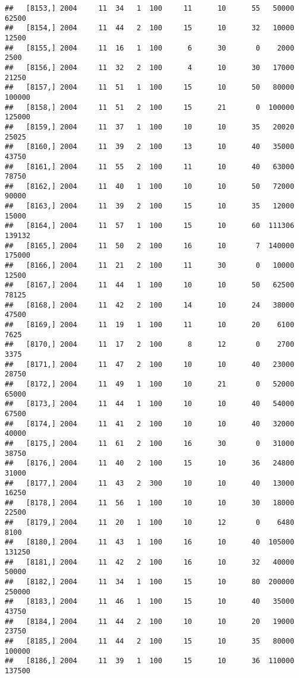 \documentclass{article}\usepackage[]{graphicx}\usepackage[]{color}
\makeatletter
\newenvironment{kframe}{%
 \def\at@end@of@kframe{}%
 \ifinner\ifhmode%
  \def\at@end@of@kframe{\end{minipage}}%
  \begin{minipage}{\columnwidth}%
 \fi\fi%
 \def\FrameCommand##1{\hskip\@totalleftmargin \hskip-\fboxsep
 \colorbox{shadecolor}{##1}\hskip-\fboxsep
     \hskip-\linewidth \hskip-\@totalleftmargin \hskip\columnwidth}%
 \MakeFramed {\advance\hsize-\width
   \@totalleftmargin\z@ \linewidth\hsize
   \@setminipage}}%
 {\par\unskip\endMakeFramed%
 \at@end@of@kframe}
\newenvironment{knitrout}{}{} %
\makeatother
\begin{document}
\begin{knitrout}
\begin{kframe}
\begin{verbatim}
##   [8153,] 2004     11  34   1  100     11      10      55   50000   62500
##   [8154,] 2004     11  44   2  100     15      10      32   10000   12500
##   [8155,] 2004     11  16   1  100      6      30       0    2000    2500
##   [8156,] 2004     11  32   2  100      4      10      30   17000   21250
##   [8157,] 2004     11  51   1  100     15      10      50   80000  100000
##   [8158,] 2004     11  51   2  100     15      21       0  100000  125000
##   [8159,] 2004     11  37   1  100     10      10      35   20020   25025
##   [8160,] 2004     11  39   2  100     13      10      40   35000   43750
##   [8161,] 2004     11  55   2  100     11      10      40   63000   78750
##   [8162,] 2004     11  40   1  100     10      10      50   72000   90000
##   [8163,] 2004     11  39   2  100     15      10      35   12000   15000
##   [8164,] 2004     11  57   1  100     15      10      60  111306  139132
##   [8165,] 2004     11  50   2  100     16      10       7  140000  175000
##   [8166,] 2004     11  21   2  100     11      30       0   10000   12500
##   [8167,] 2004     11  44   1  100     10      10      50   62500   78125
##   [8168,] 2004     11  42   2  100     14      10      24   38000   47500
##   [8169,] 2004     11  19   1  100     11      10      20    6100    7625
##   [8170,] 2004     11  17   2  100      8      12       0    2700    3375
##   [8171,] 2004     11  47   2  100     10      10      40   23000   28750
##   [8172,] 2004     11  49   1  100     10      21       0   52000   65000
##   [8173,] 2004     11  44   1  100     10      10      40   54000   67500
##   [8174,] 2004     11  41   2  100     10      10      40   32000   40000
##   [8175,] 2004     11  61   2  100     16      30       0   31000   38750
##   [8176,] 2004     11  40   2  100     15      10      36   24800   31000
##   [8177,] 2004     11  43   2  300     10      10      40   13000   16250
##   [8178,] 2004     11  56   1  100     10      10      30   18000   22500
##   [8179,] 2004     11  20   1  100     10      12       0    6480    8100
##   [8180,] 2004     11  43   1  100     16      10      40  105000  131250
##   [8181,] 2004     11  42   2  100     16      10      32   40000   50000
##   [8182,] 2004     11  34   1  100     15      10      80  200000  250000
##   [8183,] 2004     11  46   1  100     15      10      40   35000   43750
##   [8184,] 2004     11  44   2  100     10      10      20   19000   23750
##   [8185,] 2004     11  44   2  100     15      10      35   80000  100000
##   [8186,] 2004     11  39   1  100     15      10      36  110000  137500

\end{verbatim}
\end{kframe}
\end{knitrout}
\end{document}
